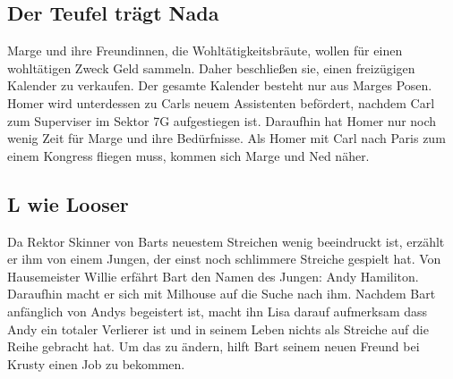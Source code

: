 
\subsection{Der Teufel trägt Nada}\label{LABF17}
Marge und ihre Freundinnen, die Wohltätigkeitsbräute, wollen für einen wohl\-tät\-ig\-en Zweck Geld sammeln. Daher beschließen sie, einen freizügigen Kalender zu verkaufen. Der gesamte Kalender besteht nur aus Marges Posen. Homer wird unterdessen zu Carls neuem Assistenten befördert, nachdem Carl zum Superviser im Sektor 7G aufgestiegen ist. Daraufhin hat Homer nur noch wenig Zeit für Marge und ihre Bedürfnisse. Als Homer mit Carl nach Paris zum einem Kongress fliegen muss, kommen sich Marge und Ned näher. 


\subsection{L wie Looser}
Da Rektor Skinner von Barts neuestem Streichen wenig beeindruckt ist, erzählt er ihm von einem Jungen, der einst noch schlimmere Streiche gespielt hat. Von Hausemeister Willie erfährt Bart den Namen des Jungen: Andy Hamiliton. Daraufhin macht er sich mit Milhouse auf die Suche nach ihm. Nachdem Bart anfänglich von Andys begeistert ist, macht ihn Lisa darauf aufmerksam dass Andy ein totaler Verlierer ist und in seinem Leben nichts als Streiche auf die Reihe gebracht hat. Um das zu ändern, hilft Bart seinem neuen Freund bei Krusty einen Job zu bekommen. 

